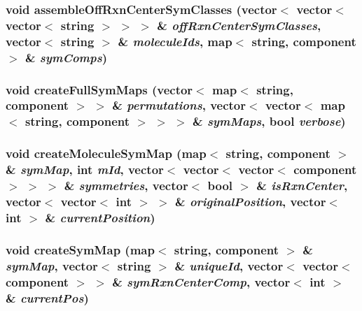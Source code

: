\subsubsection{\setlength{\rightskip}{0pt plus 5cm}void assembleOffRxnCenterSymClasses (vector$<$ vector$<$ vector$<$ string $>$ $>$ $>$ \& {\em offRxnCenterSymClasses}, vector$<$ string $>$ \& {\em moleculeIds}, map$<$ string, {\bf component} $>$ \& {\em symComps})}\label{parseSymRxns_8cpp_73d8012c69b0821b8772abbc7a40a63e}


\subsubsection{\setlength{\rightskip}{0pt plus 5cm}void createFullSymMaps (vector$<$ map$<$ string, {\bf component} $>$ $>$ \& {\em permutations}, vector$<$ vector$<$ map$<$ string, {\bf component} $>$ $>$ $>$ \& {\em symMaps}, bool {\em verbose})}\label{parseSymRxns_8cpp_46d33cbd7a794fdbc5d1fca05c4e87d9}


\subsubsection{\setlength{\rightskip}{0pt plus 5cm}void createMoleculeSymMap (map$<$ string, {\bf component} $>$ \& {\em symMap}, int {\em mId}, vector$<$ vector$<$ vector$<$ {\bf component} $>$ $>$ $>$ \& {\em symmetries}, vector$<$ bool $>$ \& {\em isRxnCenter}, vector$<$ vector$<$ int $>$ $>$ \& {\em originalPosition}, vector$<$ int $>$ \& {\em currentPosition})}\label{parseSymRxns_8cpp_946ed0891aff3283c7d457518e30c3b7}


\subsubsection{\setlength{\rightskip}{0pt plus 5cm}void createSymMap (map$<$ string, {\bf component} $>$ \& {\em symMap}, vector$<$ string $>$ \& {\em uniqueId}, vector$<$ vector$<$ {\bf component} $>$ $>$ \& {\em symRxnCenterComp}, vector$<$ int $>$ \& {\em currentPos})}\label{parseSymRxns_8cpp_22e835574ac21f0a4407bda9a967a58d}


